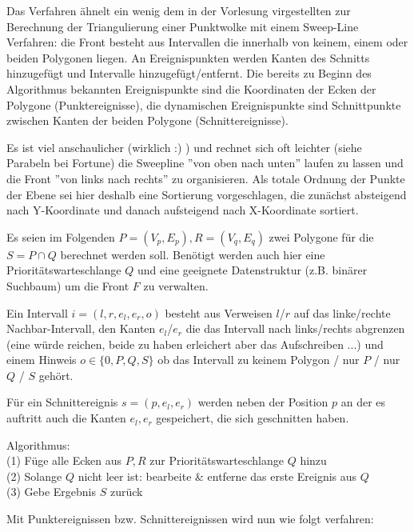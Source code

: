 Das Verfahren ähnelt ein wenig dem in der Vorlesung virgestellten zur Berechnung der Triangulierung einer Punktwolke mit einem Sweep-Line Verfahren: die Front besteht aus Intervallen die innerhalb von keinem, einem oder beiden Polygonen liegen. An Ereignispunkten werden Kanten des Schnitts hinzugefügt und Intervalle hinzugefügt/entfernt. Die bereits zu Beginn des Algorithmus bekannten Ereignispunkte sind die Koordinaten der Ecken der Polygone (Punktereignisse), die dynamischen Ereignispunkte sind Schnittpunkte zwischen Kanten der beiden Polygone (Schnittereignisse).

Es ist viel anschaulicher (wirklich :) ) und rechnet sich oft leichter (siehe Parabeln bei Fortune) die Sweepline ''von oben nach unten'' laufen zu lassen und die Front ''von links nach rechts'' zu organisieren. Als totale Ordnung der Punkte der Ebene sei hier deshalb eine Sortierung vorgeschlagen, die zunächst absteigend nach Y-Koordinate und danach aufsteigend nach X-Koordinate sortiert.

Es seien im Folgenden $P=(V_p,E_p),R=(V_q,E_q)$ zwei Polygone für die $S=P\cap Q$ berechnet werden soll. Benötigt werden auch hier eine Prioritätswarteschlange $Q$ und eine geeignete Datenstruktur (z.B. binärer Suchbaum) um die Front $F$ zu verwalten.

Ein Intervall $i=(l,r,e_l,e_r,o)$ besteht aus Verweisen $l$/$r$ auf das linke/rechte Nachbar-Intervall, den Kanten $e_l$/$e_r$ die das Intervall nach links/rechts abgrenzen (eine würde reichen, beide zu haben erleichert aber das Aufschreiben ...) und einem Hinweis $o\in\{ 0,P,Q,S\}$ ob das Intervall zu keinem Polygon / nur $P$ / nur $Q$ / $S$ gehört.

Für ein Schnittereignis $s=(p,e_l,e_r)$ werden neben der Position $p$ an der es auftritt auch die Kanten $e_l,e_r$ gespeichert, die sich geschnitten haben.

Algorithmus:\\
(1) Füge alle Ecken aus $P,R$ zur Prioritätswarteschlange $Q$ hinzu\\
(2) Solange $Q$ nicht leer ist: bearbeite \& entferne das erste Ereignis aus $Q$\\
(3) Gebe Ergebnis $S$ zurück

Mit Punktereignissen bzw. Schnittereignissen wird nun wie folgt verfahren:

